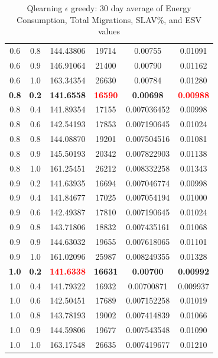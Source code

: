 \documentclass[a4paper,12pt]{Classes/RoboticsLaTeX}
\begin{document}
\begin{table}[H]
\begin{tabular}{|c|c|c|c|c|c|}
        0.6 & 0.8 & 144.43806 & 19714 & 0.00755 & 0.01091 \\ 
        0.6 & 0.9 & 146.91064 & 21400 & 0.00790 & 0.01162 \\ 
        0.6 & 1.0 & 163.34354 & 26630 & 0.00784 & 0.01280 \\ 
        \textbf{0.8} & \textbf{0.2} & \textbf{141.6558} & \textbf{\textcolor{red}{16590}} & \textbf{0.00698} & \textbf{\textcolor{red}{0.00988}} \\ 
        0.8 & 0.4 & 141.89354 & 17155 & 0.007036452 & 0.00998 \\ 
        0.8 & 0.6 & 142.54193 & 17853 & 0.007190645 & 0.01024 \\ 
        0.8 & 0.8 & 144.08870 & 19201 & 0.007504516 & 0.01081 \\ 
        0.8 & 0.9 & 145.50193 & 20342 & 0.007822903 & 0.01138 \\ 
        0.8 & 1.0 & 161.25451 & 26212 & 0.008332258 & 0.01343 \\ 
        0.9 & 0.2 & 141.63935 & 16694 & 0.007046774 & 0.00998\\ 
        0.9 & 0.4 & 141.84677 & 17025 & 0.007054194 & 0.01000\\ 
        0.9 & 0.6 & 142.49387 & 17810 & 0.007190645 & 0.01024\\ 
        0.9 & 0.8 & 143.71806 & 18832 & 0.007435161 & 0.01068\\ 
        0.9 & 0.9 & 144.63032 & 19655 & 0.007618065 & 0.01101\\ 
        0.9 & 1.0 & 161.02096 & 25987 & 0.008249355 & 0.01328\\ 
        \textbf{1.0} & \textbf{0.2} & \textbf{\textcolor{red}{141.6338}} & \textbf{16631} & \textbf{0.00700} & \textbf{0.00992} \\ 
        1.0 & 0.4 & 141.79322 & 16932 & 0.00700871 & 0.009937 \\ 
        1.0 & 0.6 & 142.50451 & 17689 & 0.007152258 & 0.01019 \\ 
        1.0 & 0.8 & 143.78193 & 19002 & 0.007414839 & 0.01066\\ 
        1.0 & 0.9 & 144.59806 & 19677 & 0.007543548 & 0.01090 \\ 
        1.0 & 1.0 & 163.17548 & 26635 & 0.007419677 & 0.01210 \\ 
        \hline
        \end{tabular}
        \caption{Qlearning $\epsilon$ greedy: 30 day average of Energy Consumption, Total Migrations, SLAV\%, and ESV values  }
        \end{table}
\end{document}
